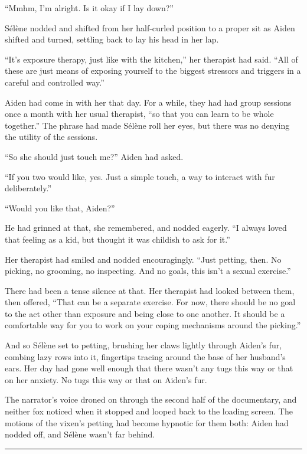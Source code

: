 ``Mmhm, I'm alright. Is it okay if I lay down?''

Sélène nodded and shifted from her half-curled position to a proper sit as Aiden shifted and turned, settling back to lay his head in her lap.

``It's exposure therapy, just like with the kitchen,'' her therapist had said. ``All of these are just means of exposing yourself to the biggest stressors and triggers in a careful and controlled way.''

Aiden had come in with her that day. For a while, they had had group sessions once a month with her usual therapist, ``so that you can learn to be whole together.'' The phrase had made Sélène roll her eyes, but there was no denying the utility of the sessions.

``So she should just touch me?'' Aiden had asked.

``If you two would like, yes. Just a simple touch, a way to interact with fur deliberately.''

``Would you like that, Aiden?''

He had grinned at that, she remembered, and nodded eagerly. ``I always loved that feeling as a kid, but thought it was childish to ask for it.''

Her therapist had smiled and nodded encouragingly. ``Just petting, then. No picking, no grooming, no inspecting. And no goals, this isn't a sexual exercise.''

There had been a tense silence at that. Her therapist had looked between them, then offered, ``That can be a separate exercise. For now, there should be no goal to the act other than exposure and being close to one another. It should be a comfortable way for you to work on your coping mechanisms around the picking.''

And so Sélène set to petting, brushing her claws lightly through Aiden's fur, combing lazy rows into it, fingertips tracing around the base of her husband's ears. Her day had gone well enough that there wasn't any tugs this way or that on her anxiety. No tugs this way or that on Aiden's fur.

The narrator's voice droned on through the second half of the documentary, and neither fox noticed when it stopped and looped back to the loading screen. The motions of the vixen's petting had become hypnotic for them both: Aiden had nodded off, and Sélène wasn't far behind.

\begin{center}\rule{0.5\linewidth}{\linethickness}\end{center}

